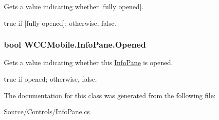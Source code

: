 Gets a value indicating whether \mbox{[}fully opened\mbox{]}. 

{\ttfamily true} if \mbox{[}fully opened\mbox{]}; otherwise, {\ttfamily false}. 
\subsubsection[{\texorpdfstring{Opened}{Opened}}]{\setlength{\rightskip}{0pt plus 5cm}bool W\+C\+C\+Mobile.\+Info\+Pane.\+Opened\hspace{0.3cm}{\ttfamily [get]}}\hypertarget{class_w_c_c_mobile_1_1_info_pane_a531dc065a09acf3e692f91f9620bc010}{}\label{class_w_c_c_mobile_1_1_info_pane_a531dc065a09acf3e692f91f9620bc010}


Gets a value indicating whether this \hyperlink{class_w_c_c_mobile_1_1_info_pane}{Info\+Pane} is opened. 

{\ttfamily true} if opened; otherwise, {\ttfamily false}. 

The documentation for this class was generated from the following file\+:\begin{DoxyCompactItemize}
\item 
Source/\+Controls/Info\+Pane.\+cs\end{DoxyCompactItemize}
